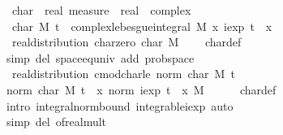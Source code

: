 \documentclass{article}
\theoremstyle{definition}
\begin{document}
\medskip

\begin{isabellebody}
\isamarkupfalse%
\isanewline
\ \ char\ {\isacharcolon}{\isacharcolon}\ {\isachardoublequoteopen}real\ measure\ {\isasymRightarrow}\ real\ {\isasymRightarrow}\ complex{\isachardoublequoteclose}\isanewline
{}\isanewline
\ \ {\isachardoublequoteopen}char\ M\ t\ {\isasymequiv}\ complex{\isacharunderscore}lebesgue{\isacharunderscore}integral\ M\ {\isacharparenleft}{\isasymlambda}x{\isachardot}\ iexp\ {\isacharparenleft}t\ {\isacharasterisk}\ x{\isacharparenright}{\isacharparenright}{\isachardoublequoteclose}\isanewline
\isanewline
{}\isamarkupfalse%
\ {\isacharparenleft}\ real{\isacharunderscore}distribution{\isacharparenright}\ char{\isacharunderscore}zero{\isacharcolon}\ {\isachardoublequoteopen}char\ M\ {}\ {\isacharequal}\ {}{\isachardoublequoteclose}\isanewline
{}\isamarkupfalse%
\ char{\isacharunderscore}def\ \isamarkupfalse%
\ {\isacharparenleft}simp\ del{\isacharcolon}\ space{\isacharunderscore}eq{\isacharunderscore}univ\ add{\isacharcolon}\ prob{\isacharunderscore}space{\isacharparenright}
\isamarkupfalse%
\ {\isacharparenleft}\ real{\isacharunderscore}distribution{\isacharparenright}\ cmod{\isacharunderscore}char{\isacharunderscore}le{\isacharunderscore}{}{\isacharcolon}\ {\isachardoublequoteopen}norm\ {\isacharparenleft}char\ M\ t{\isacharparenright}\ {\isasymle}\ {}{\isachardoublequoteclose}\isanewline
{}\isamarkupfalse%
\ {\isacharminus}\isanewline
\ \ \isamarkupfalse%
\ {\isachardoublequoteopen}norm\ {\isacharparenleft}char\ M\ t{\isacharparenright}\ {\isasymle}\ {\isacharparenleft}{\isasymintegral}x{\isachardot}\ norm\ {\isacharparenleft}iexp\ {\isacharparenleft}t\ {\isacharasterisk}\ x{\isacharparenright}{\isacharparenright}\ {\isasympartial}M{\isacharparenright}{\isachardoublequoteclose}\isanewline
\ \ \ \ \isamarkupfalse%
\ char{\isacharunderscore}def\ \isamarkupfalse%
\ {\isacharparenleft}intro\ integral{\isacharunderscore}norm{\isacharunderscore}bound\ integrable{\isacharunderscore}iexp{\isacharparenright}\ auto\isanewline
\ \ \isamarkupfalse%
\ \isamarkupfalse%
\ {\isachardoublequoteopen}{\isasymdots}\ {\isasymle}\ {}{\isachardoublequoteclose}\isanewline
\ \ \ \ \isamarkupfalse%
\ {\isacharparenleft}simp\ del{\isacharcolon}\ of{\isacharunderscore}real{\isacharunderscore}mult{\isacharparenright}\isanewline

\end{isabellebody}
\end{document}
